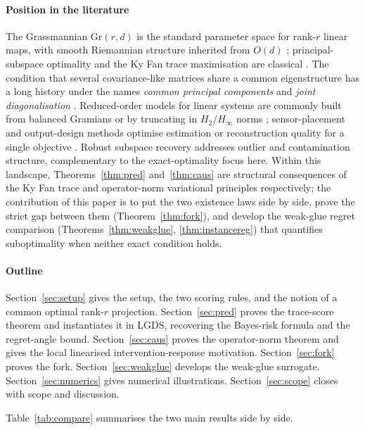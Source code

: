 \documentclass[final,3p,times]{elsarticle}
\newcommand{\Gr}{\mathrm{Gr}}
\begin{document}
\paragraph{Position in the literature}
The Grassmannian $\Gr(r,d)$ is the standard parameter space for rank-$r$
linear maps, with smooth Riemannian structure inherited from $O(d)$
\cite{Edelman1998}; principal-subspace optimality and the Ky Fan trace
maximisation are classical \cite{Fan1949,HornJohnson2013,Hotelling1933}.
The condition that several covariance-like matrices share a common
eigenstructure has a long history under the names \emph{common principal
components} \cite{Flury1984,Krzanowski1979} and \emph{joint
diagonalisation} \cite{Pham2001}.
Reduced-order models for linear systems are commonly built from balanced
Gramians \cite{Moore1981} or by truncating in $H_2$/$H_\infty$ norms
\cite{Antoulas2005}; sensor-placement and output-design methods optimise
estimation or reconstruction quality for a single objective
\cite{JoshiBoyd2009}.
Robust subspace recovery \cite{LermanMaunu2018} addresses outlier and
contamination structure, complementary to the exact-optimality focus
here.
Within this landscape, Theorems~\ref{thm:pred} and~\ref{thm:caus} are
structural consequences of the Ky Fan trace and operator-norm variational
principles respectively; the contribution of this paper is to put the
two existence laws side by side, prove the strict gap between them
(Theorem~\ref{thm:fork}), and develop the weak-glue regret comparison
(Theorems~\ref{thm:weakglue}, \ref{thm:instancereg}) that quantifies
suboptimality when neither exact condition holds.

\paragraph{Outline}
Section~\ref{sec:setup} gives the setup, the two scoring rules, and the
notion of a common optimal rank-$r$ projection.
Section~\ref{sec:pred} proves the trace-score theorem and instantiates
it in LGDS, recovering the Bayes-risk formula and the regret-angle bound.
Section~\ref{sec:caus} proves the operator-norm theorem and gives the
local linearised intervention-response motivation.
Section~\ref{sec:fork} proves the fork.
Section~\ref{sec:weakglue} develops the weak-glue surrogate.
Section~\ref{sec:numerics} gives numerical illustrations.
Section~\ref{sec:scope} closes with scope and discussion.

Table~\ref{tab:compare} summarises the two main results side by side.
\end{document}
